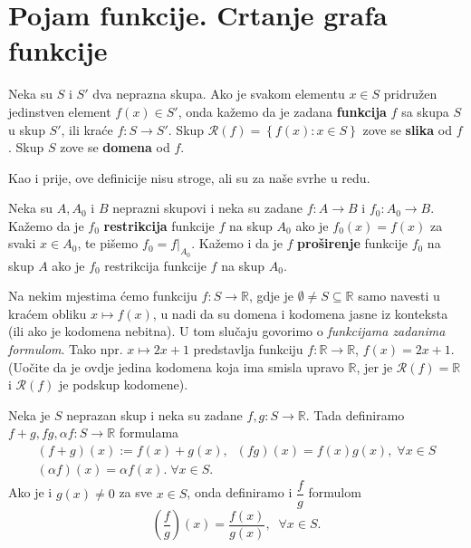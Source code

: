 \section{Pojam funkcije. Crtanje grafa funkcije}

\begin{definition}
Neka su $S$ i $S'$ dva neprazna skupa. Ako je svakom elementu $x\in S$ pridružen jedinstven element $f(x)\in S'$, onda kažemo da je zadana \textbf{funkcija} $f$ sa skupa $S$ u skup $S'$, ili kraće $f : S\to S'$. Skup $\mathcal{R}(f)=\left\{ f(x) : x\in S\right\}$ zove se \textbf{slika} od $f$. Skup $S$ zove se \textbf{domena} od $f$.
\end{definition}

Kao i prije, ove definicije nisu stroge, ali su za naše svrhe u redu.

\begin{definition}
Neka su $A, A_0$ i $B$ neprazni skupovi i neka su zadane $f : A\to B$ i $f_0 : A_0\to B$. Kažemo da je $f_0$ \textbf{restrikcija} funkcije $f$ na skup $A_0$ ako je $f_0(x)=f(x)$ za svaki $x\in A_0$, te pišemo $f_0=f|_{A_0}$. Kažemo i da je $f$ \textbf{proširenje} funkcije $f_0$ na skup $A$ ako je $f_0$ restrikcija funkcije $f$ na skup $A_0$. 
\end{definition}

\begin{remark}
Na nekim mjestima ćemo funkciju $f : S\to \mathbb{R}$, gdje je $\emptyset\neq S\subseteq \mathbb{R}$ samo navesti u kraćem obliku $x\mapsto f(x)$, u nadi da su domena i kodomena jasne iz konteksta (ili ako je kodomena nebitna). U tom slučaju govorimo o \textit{funkcijama zadanima formulom}. Tako npr. $x\mapsto 2x+1$ predstavlja funkciju $f : \mathbb{R}\to \mathbb{R}$, $f(x)=2x+1$. (Uočite da je ovdje jedina kodomena koja ima smisla upravo $\mathbb{R}$, jer je $\mathcal{R}(f)=\mathbb{R}$ i $\mathcal{R}(f)$ je podskup kodomene).
\end{remark}

\begin{definition}
Neka je $S$ neprazan skup i neka su zadane $f, g : S\to \mathbb{R}$. Tada definiramo $f+g, fg, \alpha f : S\to \mathbb{R}$ formulama
\begin{gather*}
(f+g)(x):=f(x)+g(x),\;\;(fg)(x)=f(x)g(x),\;\forall x\in S\\
(\alpha f)(x)=\alpha f(x).\;\forall x\in S.
\end{gather*}
Ako je i $g(x)\neq 0$ za sve $x\in S$, onda definiramo i $\dfrac{f}{g}$ formulom $$\left(\dfrac{f}{g}\right)(x)=\dfrac{f(x)}{g(x)},\;\;\forall x\in S.$$
\end{definition}


